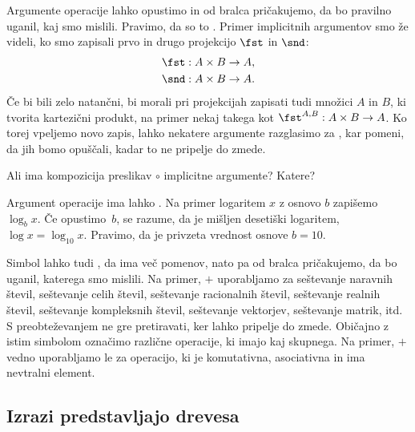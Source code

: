 Argumente operacije lahko opustimo in od bralca pričakujemo, da bo pravilno uganil, kaj smo mislili. Pravimo, da so to
. Primer implicitnih argumentov smo že videli, ko smo zapisali prvo in drugo projekcijo $\fst$ in
$\snd$:
\begin{align*}
  \fst &: A \times B \to A, \\
  \snd &: A \times B \to A.
\end{align*}
%
Če bi bili zelo natančni, bi morali pri projekcijah zapisati tudi množici $A$ in $B$, ki tvorita kartezični produkt, na
primer nekaj takega kot $\fst^{A,B} : A \times B \to A$.
%
Ko torej vpeljemo novo zapis, lahko nekatere argumente razglasimo za , kar pomeni, da jih bomo opuščali,
kadar to ne pripelje do zmede.

\begin{vaja}
  Ali ima kompozicija preslikav $\circ$ implicitne argumente? Katere?
\end{vaja}

Argument operacije ima lahko . Na primer logaritem $x$ z osnovo $b$ zapišemo $\log_b x$. Če opustimo~$b$, se razume, da je mišljen desetiški logaritem, $\log x = \log_10 x$. Pravimo, da je privzeta vrednost osnove $b = 10$.

Simbol lahko tudi , da ima več pomenov, nato pa od bralca pričakujemo, da bo uganil, katerega smo
mislili. Na primer, $+$ uporabljamo za
%
seštevanje naravnih števil,
seštevanje celih števil,
seštevanje racionalnih števil,
seštevanje realnih števil,
seštevanje kompleksnih števil,
seštevanje vektorjev,
seštevanje matrik,
itd.
%
S preobteževanjem ne gre pretiravati, ker lahko pripelje do zmede. Običajno z istim simbolom označimo različne operacije, ki imajo kaj skupnega. Na primer, $+$ vedno uporabljamo le za operacijo, ki je komutativna, asociativna in ima nevtralni element.

\subsection{Izrazi predstavljajo drevesa}


